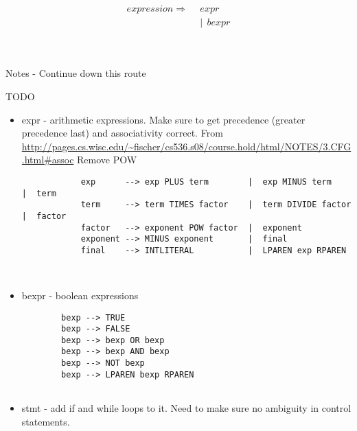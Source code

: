 \documentclass[12pt, letterpaper]{article}
\begin{document}
	
	\hfill\\\hfill\\
	\begin{equation} \label{eq_2_1}
		\begin{aligned}
			expression \Rightarrow\ \ &expr\\
				&|\ \ bexpr
		\end{aligned}
	\end{equation}
	
	
	
	\hfill\\\hfill\\
	Notes - Continue down this route
	
	TODO
	\begin{itemize}
		\item expr - arithmetic expressions. Make sure to get precedence (greater precedence last) and associativity correct.
		From \url{http://pages.cs.wisc.edu/~fischer/cs536.s08/course.hold/html/NOTES/3.CFG.html#assoc} Remove POW
		\begin{verbatim}
			exp      --> exp PLUS term        |  exp MINUS term      |  term
			term     --> term TIMES factor    |  term DIVIDE factor  |  factor
			factor   --> exponent POW factor  |  exponent
			exponent --> MINUS exponent       |  final
			final    --> INTLITERAL           |  LPAREN exp RPAREN

		
		\end{verbatim}
		
		
		\item bexpr - boolean expressions
		
		\begin{verbatim}
		bexp --> TRUE
		bexp --> FALSE
		bexp --> bexp OR bexp
		bexp --> bexp AND bexp
		bexp --> NOT bexp
		bexp --> LPAREN bexp RPAREN
		
		\end{verbatim}
		\item  stmt - add if and while loops to it. Need to make sure no ambiguity in control statements. 
	\end{itemize}
\end{document}
